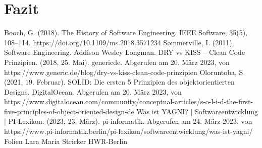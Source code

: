 \documentclass[conference]{IEEEtran}
\begin{document}
\section{Fazit}



\begin{thebibliography}{00}
 Booch, G. (2018). The History of Software Engineering. IEEE Software, 35(5), 108–114. https://doi.org/10.1109/ms.2018.3571234
 Sommerville, I. (2011). Software Engineering. Addison Wesley Longman.
 DRY vs KISS – Clean Code Prinzipien. (2018, 25. Mai). genericde. Abgerufen am 20. März 2023, von https://www.generic.de/blog/dry-vs-kiss-clean-code-prinzipien
 Oloruntoba, S. (2021, 19. Februar). SOLID: Die ersten 5 Prinzipien des objektorientierten Designs. DigitalOcean. Abgerufen am 20. März 2023, von https://www.digitalocean.com/community/conceptual-articles/s-o-l-i-d-the-first-five-principles-of-object-oriented-design-de
 Was ist YAGNI? | Softwareentwicklung | PI-Lexikon. (2023, 23. März). pi-informatik. Abgerufen am 24. März 2023, von https://www.pi-informatik.berlin/pi-lexikon/softwareentwicklung/was-ist-yagni/
 Folien Lara Maria Stricker HWR-Berlin

\end{thebibliography}
\vspace{12pt}
\end{document}
